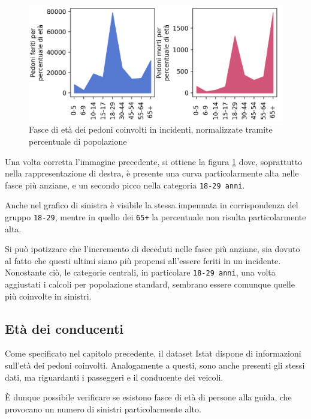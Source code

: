 \documentclass[a4paper,12pt]{report}
\newcommand{\columnstyle}[1]{\texttt{#1}}
\begin{document}
\begin{figure}
    \includegraphics[width=\linewidth]{../src/incidenti/incidenti_senza_coords/pedoni/eta_pedoni_norm.png}
    \caption{Fasce di età dei pedoni coinvolti in incidenti, normalizzate tramite percentuale di popolazione}
    \label{fig:eta-pedoni-norm}
\end{figure}

Una volta corretta l'immagine precedente, si ottiene la figura \ref{fig:eta-pedoni-norm} 
dove, soprattutto nella rappresentazione di destra, è presente una curva particolarmente alta 
nelle fasce più anziane, e un secondo picco nella categoria \columnstyle{18-29 anni}. 

Anche nel grafico di sinistra è visibile la stessa impennata in corrispondenza 
del gruppo \columnstyle{18-29}, mentre in quello dei \columnstyle{65+} la 
percentuale non risulta particolarmente alta. 

Si può ipotizzare che l'incremento di deceduti nelle fasce più anziane, sia dovuto al 
fatto che questi ultimi siano più propensi all'essere feriti in un incidente. 
Nonostante ciò, le categorie centrali, in particolare \columnstyle{18-29 anni}, 
una volta aggiustati i calcoli per popolazione standard, sembrano essere comunque 
quelle più coinvolte in sinistri. 

\subsection{Età dei conducenti}

Come specificato nel capitolo precedente, il dataset Istat dispone di 
informazioni sull'età dei pedoni coinvolti. Analogamente a questi, 
sono anche presenti gli stessi dati, ma riguardanti i passeggeri e il conducente dei 
veicoli. 

\`E dunque possibile verificare se esistono fasce di età di persone alla guida, 
che provocano un numero di sinistri particolarmente alto. 
\end{document}
